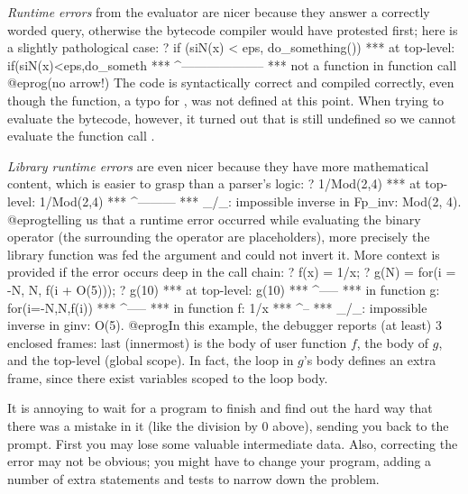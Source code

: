 \emph{Runtime errors} from the evaluator are nicer because they answer a
correctly worded query, otherwise the bytecode compiler would have protested
first; here is a slightly pathological case:
\bprog
? if (siN(x) < eps, do_something())
  ***   at top-level: if(siN(x)<eps,do_someth
  ***                    ^--------------------
  ***   not a function in function call
@eprog\noindent (no arrow!) The code is syntactically correct and compiled
correctly, even though the  function, a typo for , was not
defined at this point. When trying to evaluate the bytecode, however, it
turned out that  is still undefined so we cannot evaluate the
function call .

\emph{Library runtime errors} are even nicer because they have more
mathematical content, which is easier to grasp than a parser's logic:
\bprog
? 1/Mod(2,4)
  ***   at top-level: 1/Mod(2,4)
  ***                  ^---------
  *** _/_: impossible inverse in Fp_inv: Mod(2, 4).
@eprog\noindent telling us that a runtime error occurred while evaluating the
binary \kbd{/} operator (the \kbd{\_} surrounding the operator are
placeholders), more precisely the  library function was fed
the argument  and could not invert it. More context is provided
if the error occurs deep in the call chain:
\bprog
? f(x) = 1/x;
? g(N) = for(i = -N, N, f(i + O(5)));
? g(10)
  ***   at top-level: g(10)
  ***                 ^-----
  ***   in function g: for(i=-N,N,f(i))
  ***                             ^-----
  ***   in function f: 1/x
  ***                   ^--
  *** _/_: impossible inverse in ginv: O(5).
@eprog\noindent In this example, the debugger reports (at least) 3 enclosed
frames: last (innermost) is the body of user function $f$, the body of $g$,
and the top-level (global scope). In fact, the  loop in $g$'s body
defines an extra frame, since there exist variables scoped to the loop body.

\label{se:errorrec}

It is annoying to wait for a program to finish and find out the hard
way that there was a mistake in it (like the division by 0 above), sending
you back to the prompt. First you may lose some valuable intermediate data.
Also, correcting the error may not be obvious; you might have to change your
program, adding a number of extra statements and tests to narrow down
the problem.

